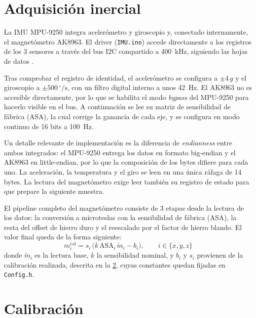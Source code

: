 \section{Adquisición inercial}
\label{sec:fw_imu}

La IMU MPU-9250 integra acelerómetro y giroscopio y, conectado internamente, el
magnetómetro AK8963. El driver (\texttt{IMU.ino}) accede directamente a los
registros de los 3 sensores a través del bus I2C compartido a \SI{400}{\kilo\hertz},
siguiendo las hojas de datos \cite{ps_mpu9250, ds_ak8963}.

Tras comprobar el registro de identidad, el acelerómetro se configura a
$\pm 4\,g$ y el giroscopio a $\pm 500\,^{\circ}/\mathrm{s}$, con un filtro
digital interno a unos \SI{42}{\hertz}. El AK8963 no es accesible directamente,
por lo que se habilita el modo \textit{bypass} del MPU-9250 para hacerlo visible en el
bus. A continuación se lee su matriz de sensibilidad de fábrica (ASA), la cual corrige la ganancia de cada eje, y se configura en modo
continuo de 16 bits a \SI{100}{\hertz}.

Un detalle relevante de implementación es la diferencia de \textit{endianness}
entre ambos integrados: el MPU-9250 entrega los datos en formato big-endian y el
AK8963 en little-endian, por lo que la composición de los bytes difiere para
cada uno. La aceleración, la temperatura y el giro se leen en una única ráfaga
de 14 bytes. La lectura del magnetómetro exige leer también su registro de
estado para que prepare la siguiente muestra.

El pipeline completo del magnetómetro consiste de 3 etapas desde la lectura de los datos: la conversión a microteslas
con la sensibilidad de fábrica (ASA), la resta del offset de hierro duro y el
reescalado por el factor de hierro blando. El valor final queda de la forma siguiente:
\begin{equation}
    m_i^{\text{cal}} = s_i\,\bigl(k\,\mathrm{ASA}_i\,\tilde{m}_i - b_i\bigr),
    \qquad i \in \{x,y,z\}
\end{equation}
donde $\tilde{m}_i$ es la lectura base, $k$ la sensibilidad nominal, y
$b_i$ y $s_i$ provienen de la calibración realizada, descrita en la
\cref{sec:fw_calibracion}, cuyas constantes quedan  fijadas en \texttt{Config.h}.


\section{Calibración}
\label{sec:fw_calibracion}

